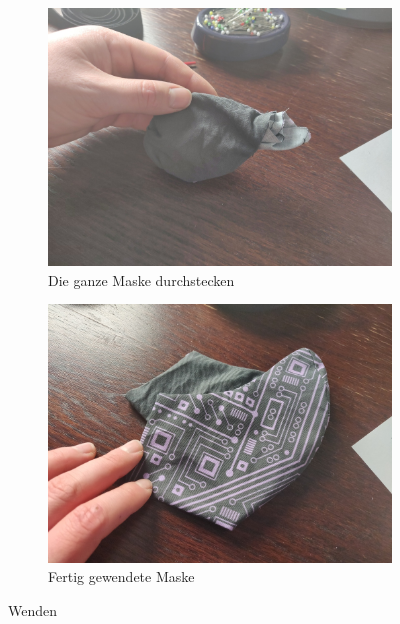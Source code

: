 \documentclass[12pt,parskip=full]{scrartcl}
\begin{document}
\begin{figure}[ht]
    \begin{subfigure}{0.48\textwidth}
        \centering
        \includegraphics[width = \linewidth]{Pictures/07_Turning/Turning5_resized.jpg}
        \caption{Die ganze Maske durchstecken}
        \label{Turning5}
    \end{subfigure}
    \begin{subfigure}{0.48\textwidth}
        \centering
        \includegraphics[width = \linewidth]{Pictures/07_Turning/Turning6_resized.jpg}
        \caption{Fertig gewendete Maske}
        \label{Turning6}
    \end{subfigure}
    \caption{Wenden}
    \label{TurningSecond}
\end{figure}
\end{document}

